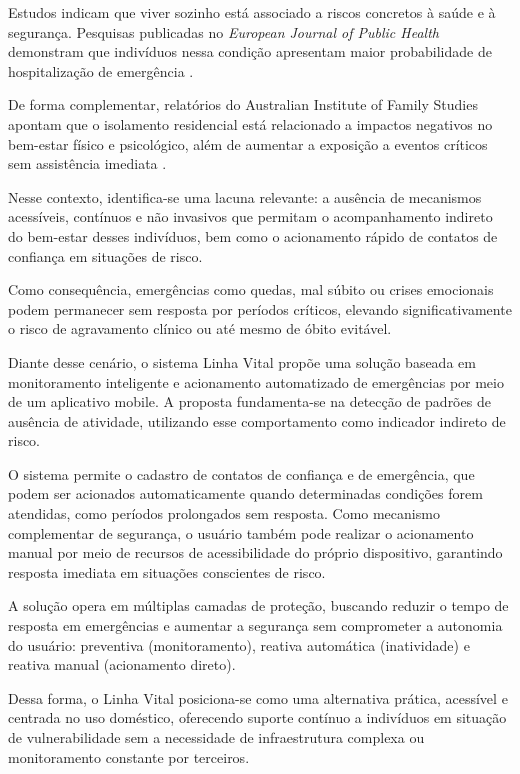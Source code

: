 Estudos indicam que viver sozinho está associado a riscos concretos à saúde e à segurança. Pesquisas publicadas no \textit{European Journal of Public Health} demonstram que indivíduos nessa condição apresentam maior probabilidade de hospitalização de emergência \cite{kandler2017}.

De forma complementar, relatórios do Australian Institute of Family Studies apontam que o isolamento residencial está relacionado a impactos negativos no bem-estar físico e psicológico, além de aumentar a exposição a eventos críticos sem assistência imediata \cite{aifs2014}.

Nesse contexto, identifica-se uma lacuna relevante: a ausência de mecanismos acessíveis, contínuos e não invasivos que permitam o acompanhamento indireto do bem-estar desses indivíduos, bem como o acionamento rápido de contatos de confiança em situações de risco.

Como consequência, emergências como quedas, mal súbito ou crises emocionais podem permanecer sem resposta por períodos críticos, elevando significativamente o risco de agravamento clínico ou até mesmo de óbito evitável.

Diante desse cenário, o sistema Linha Vital propõe uma solução baseada em monitoramento inteligente e acionamento automatizado de emergências por meio de um aplicativo mobile. A proposta fundamenta-se na detecção de padrões de ausência de atividade, utilizando esse comportamento como indicador indireto de risco.

O sistema permite o cadastro de contatos de confiança e de emergência, que podem ser acionados automaticamente quando determinadas condições forem atendidas, como períodos prolongados sem resposta. Como mecanismo complementar de segurança, o usuário também pode realizar o acionamento manual por meio de recursos de acessibilidade do próprio dispositivo, garantindo resposta imediata em situações conscientes de risco.

A solução opera em múltiplas camadas de proteção, buscando reduzir o tempo de resposta em emergências e aumentar a segurança sem comprometer a autonomia do usuário: preventiva (monitoramento), reativa automática (inatividade) e reativa manual (acionamento direto).

Dessa forma, o Linha Vital posiciona-se como uma alternativa prática, acessível e centrada no uso doméstico, oferecendo suporte contínuo a indivíduos em situação de vulnerabilidade sem a necessidade de infraestrutura complexa ou monitoramento constante por terceiros.

